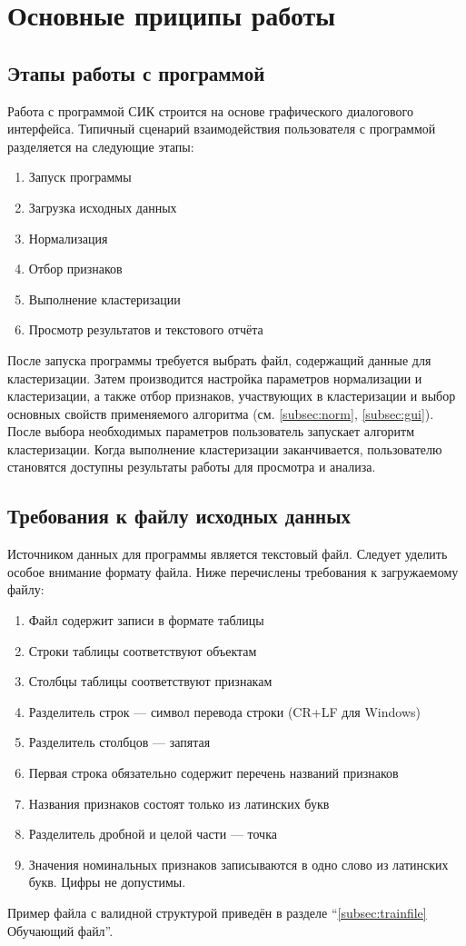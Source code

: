 \documentclass[12pt,twoside,a4paper,tikz,border=5]{refart}
\begin{document}
\section{Основные приципы работы}

\subsection{Этапы работы с программой}
Работа с программой СИК строится на основе графического диалогового интерфейса. Типичный сценарий взаимодействия пользователя с программой разделяется на следующие этапы:
\begin{enumerate}
	\item Запуск программы
	\item Загрузка исходных данных
	\item Нормализация
	\item Отбор признаков
	\item Выполнение кластеризации
	\item Просмотр результатов и текстового отчёта
\end{enumerate}

После запуска программы требуется выбрать файл, содержащий данные для кластеризации. Затем производится настройка параметров нормализации и кластеризации, а также отбор признаков, участвующих в кластеризации и выбор основных свойств применяемого алгоритма (см. \ref{subsec:norm}, \ref{subsec:gui}). После выбора необходимых параметров пользователь запускает алгоритм кластеризации. Когда выполнение кластеризации заканчивается, пользователю становятся доступны результаты работы для просмотра и анализа. 

\subsection{Требования к файлу исходных данных}
\label{subsec:req}
Источником данных для программы является текстовый файл. Следует уделить особое внимание формату файла. Ниже перечислены требования к загружаемому файлу:
\begin{enumerate}
	\item Файл содержит записи в формате таблицы
	\item Строки таблицы соответствуют объектам
	\item Столбцы таблицы соответствуют признакам
	\item Разделитель строк --- символ перевода строки (CR+LF для Windows)
	\item Разделитель столбцов --- запятая
	\item Первая строка обязательно содержит перечень названий признаков
	\item Названия признаков состоят только из латинских букв
	\item Разделитель дробной и целой части --- точка
	\item Значения номинальных признаков записываются в одно слово из латинских букв. Цифры не допустимы.
\end{enumerate}
Пример файла с  валидной структурой приведён в разделе ``\ref{subsec:trainfile} Обучающий файл''.
\end{document}

